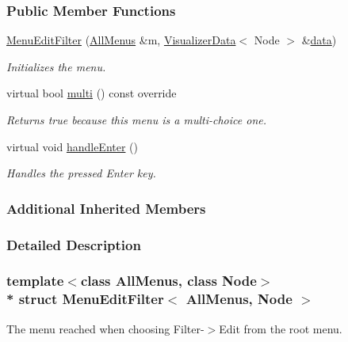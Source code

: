 \subsubsection*{Public Member Functions}
\begin{DoxyCompactItemize}
\item 
\hyperlink{structMenuEditFilter_aaf747696a982b27503d7fc666f492c63}{Menu\+Edit\+Filter} (\hyperlink{structAllMenus}{All\+Menus} \&m, \hyperlink{structVisualizerData}{Visualizer\+Data}$<$ Node $>$ \&\hyperlink{structMenuBase_a819aaaa06ede3bffbb12c1390657ef64}{data})
\begin{DoxyCompactList}\small\item\em Initializes the menu. \end{DoxyCompactList}\item 
virtual bool \hyperlink{structMenuEditFilter_a0918b1d46e7488b562b9e8e36e3d60f5}{multi} () const override
\begin{DoxyCompactList}\small\item\em Returns {\ttfamily true} because this menu is a multi-\/choice one. \end{DoxyCompactList}\item 
virtual void \hyperlink{structMenuEditFilter_a7d4f60896f4a44285f9c40accbff4a58}{handle\+Enter} ()\hypertarget{structMenuEditFilter_a7d4f60896f4a44285f9c40accbff4a58}{}\label{structMenuEditFilter_a7d4f60896f4a44285f9c40accbff4a58}

\begin{DoxyCompactList}\small\item\em Handles the pressed Enter key. \end{DoxyCompactList}\end{DoxyCompactItemize}
\subsubsection*{Additional Inherited Members}


\subsubsection{Detailed Description}
\subsubsection*{template$<$class All\+Menus, class Node$>$\\*
struct Menu\+Edit\+Filter$<$ All\+Menus, Node $>$}

The menu reached when choosing Filter-\/$>$Edit from the root menu. 


